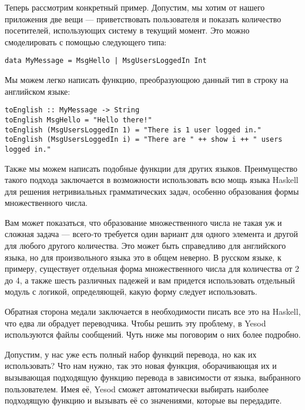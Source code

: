 Теперь рассмотрим конкретный пример. Допустим, мы хотим от нашего приложения две вещи --- приветствовать пользователя и показать количество посетителей, использующих систему в текущий момент. Это можно смоделировать с помощью следующего типа:

\begin{lstlisting}
data MyMessage = MsgHello | MsgUsersLoggedIn Int
\end{lstlisting}

Мы можем легко написать функцию, преобразующюю данный тип в строку на английском языке:

\begin{lstlisting}
toEnglish :: MyMessage -> String
toEnglish MsgHello = "Hello there!"
toEnglish (MsgUsersLoggedIn 1) = "There is 1 user logged in."
toEnglish (MsgUsersLoggedIn i) = "There are " ++ show i ++ " users logged in."
\end{lstlisting}

Также мы можем написать подобные функции для других языков. Преимущество такого подхода заключается в возможности использовать всю мощь языка Haskell для решения нетривиальных грамматических задач, особенно образования формы множественного числа. %

\begin{remark}
Вам может показаться, что образование множественного числа не такая уж и сложная задача --- всего-то требуется один вариант для одного элемента и другой для любого другого количества. Это может быть справедливо для английского языка, но для произвольного языка это в общем неверно. В русском языке, к примеру, существует отдельная форма множественного числа для количества от 2 до 4, а также шесть различных падежей и вам придется использовать отдельный модуль с логикой, определяющей, какую форму следует использовать.
\end{remark}

Обратная сторона медали заключается в необходимости писать все это на Haskell, что едва ли обрадует переводчика. Чтобы решить эту проблему, в Yesod используются файлы сообщений. Чуть ниже мы поговорим о них более подробно. %

Допустим, у нас уже есть полный набор функций перевода, но как их использовать? Что нам нужно, так это новая функция, оборачивающая их и вызывающая подходящую функцию перевода в зависимости от языка, выбранного пользователем. Имея её, Yesod сможет автоматически выбирать наиболее подходящую функцию и вызывать её со значениями, которые вы передадите.

